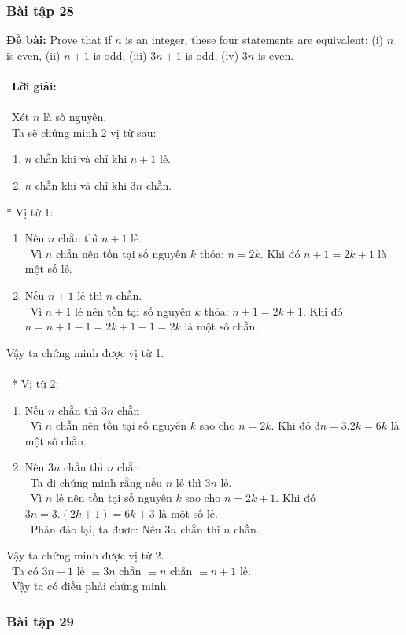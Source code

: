 \documentclass[a4paper]{article}
\begin{document}
\subsubsection{Bài tập 28}
\textbf{Đề bài: } Prove that if $n$ is an integer, these four statements are equivalent: (i) $n$ is even, (ii) $n + 1$ is odd, (iii) $3n + 1$ is odd, (iv) $3n$ is even.\\\ \\\
\textbf{Lời giải:} \\\ \\\
Xét $n$ là số nguyên. \\\
Ta sẽ chứng minh 2 vị từ sau:
\begin{enumerate}
\item $n$ chẵn khi và chỉ khi $n+1$ lẻ.
\item $n$ chẵn khi và chỉ khi $3n$ chẵn.
\end{enumerate}
* Vị từ 1: 
\begin{enumerate}
\item Nếu $n$ chẵn thì $n+1$ lẻ. \\\
Vì $n$ chẵn nên tồn tại số nguyên $k$ thỏa: $n=2k$. Khi đó $n+1=2k+1$ là một số lẻ.
\item Nếu $n+1$ lẻ thì $n$ chẵn. \\\
Vì $n+1$ lẻ nên tồn tại số nguyên $k$ thỏa: $n+1=2k+1$. Khi đó $n=n+1-1=2k+1-1=2k$ là một số chẵn.
\end{enumerate}
Vậy ta chứng minh được vị từ 1. \\\ \\\
* Vị từ 2:
\begin{enumerate}
\item Nếu $n$ chẵn thì $3n$ chẵn \\\
Vì $n$ chẵn nên tồn tại số nguyên $k$ sao cho $n=2k$. Khi đó $3n=3.2k=6k$ là một số chẵn.
\item Nếu $3n$ chẵn thì $n$ chẵn \\\
Ta đi chứng minh rằng nếu $n$ lẻ thì $3n$ lẻ. \\\
Vì $n$ lẻ nên tồn tại số nguyên $k$ sao cho $n=2k+1$. Khi đó $3n=3.(2k+1) = 6k+3$ là một số lẻ. \\\
Phản đảo lại, ta được: Nếu $3n$ chẵn thì $n$ chẵn.
\end{enumerate}
Vậy ta chứng minh được vị từ 2. \\\
Ta có $3n+1$ lẻ $\equiv 3n$ chẵn $\equiv n$ chẵn $\equiv n+1$ lẻ. \\\
Vậy ta có điều phải chứng minh. 

\clearpage
\subsubsection{Bài tập 29}
\end{document}
